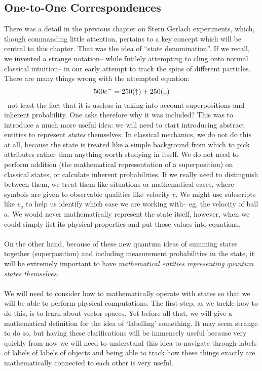 \subsection{One-to-One Correspondences}
There was a detail in the previous chapter on Stern Gerlach experiments, which, though commanding little attention, pertains to a key concept which will be central to this chapter. That was the idea of ``state denomination''. If we recall, we invented a strange notation-- while futilely attempting to cling onto normal classical intuition--  in our early attempt to track the spins of different particles. There are many things wrong with the attempted equation:
$$
500e^{-}=250(\uparrow) + 250(\downarrow)
$$
--not least the fact that it is useless in taking into account superpositions and inherent probability. One asks therefore why it was included? This was to introduce a much more useful idea: we will need to start introducing abstract entities to represent \textit{states} themselves. In classical mechanics, we do not do this at all, because the state is treated like a simple background from which to pick attributes rather than anything worth studying in itself. We do not need to perform addition (the mathematical representation of a superposition) on classical states, or calculate inherent probabilities. If we really need to distinguish between them, we treat them like situations or mathematical cases, where symbols are given to observable qualities like velocity $v$. We might use subscripts like $v_{a}$ to help us identify which case we are working with-- eg, the velocity of ball $a$. We would never mathematically represent the state itself, however, when we could simply list its physical properties and put those values into equations. 
\\\\
On the other hand, because of these new quantum ideas of summing states together (superposition) and including measurement probabilities in the state, it will be extremely important to have \textit{mathematical entities representing quantum states themselves}. 
\\\\
We will need to consider how to mathematically operate with states so that we will be able to perform physical computations. The first step, as we tackle how to do this, is to learn about vector spaces. Yet before all that, we will give a mathematical definition for the idea of `labelling' something. It may seem strange to do so, but having these clarifications will be immensely useful because very quickly from now we will need to understand this idea to navigate through labels of labels of labels of objects and being able to track how these things exactly are mathematically connected to each other is very useful.
